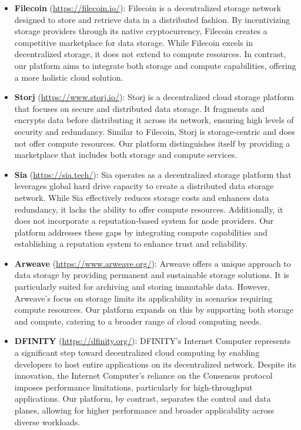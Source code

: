 \begin{itemize}
    \item {\bf Filecoin} (\url{https://filecoin.io/}): Filecoin is a decentralized storage network designed to store and retrieve data in a distributed fashion. By incentivizing storage providers through its native cryptocurrency, Filecoin creates a competitive marketplace for data storage. While Filecoin excels in decentralized storage, it does not extend to compute resources. In contrast, our platform aims to integrate both storage and compute capabilities, offering a more holistic cloud solution.

    \item {\bf Storj} (\url{https://www.storj.io/}): Storj is a decentralized cloud storage platform that focuses on secure and distributed data storage. It fragments and encrypts data before distributing it across its network, ensuring high levels of security and redundancy. Similar to Filecoin, Storj is storage-centric and does not offer compute resources. Our platform distinguishes itself by providing a marketplace that includes both storage and compute services.

    \item {\bf Sia} (\url{https://sia.tech/}): Sia operates as a decentralized storage platform that leverages global hard drive capacity to create a distributed data storage network. While Sia effectively reduces storage costs and enhances data redundancy, it lacks the ability to offer compute resources. Additionally, it does not incorporate a reputation-based system for node providers. Our platform addresses these gaps by integrating compute capabilities and establishing a reputation system to enhance trust and reliability.

    \item {\bf Arweave} (\url{https://www.arweave.org/}): Arweave offers a unique approach to data storage by providing permanent and sustainable storage solutions. It is particularly suited for archiving and storing immutable data. However, Arweave's focus on storage limits its applicability in scenarios requiring compute resources. Our platform expands on this by supporting both storage and compute, catering to a broader range of cloud computing needs.

    \item {\bf DFINITY} (\url{https://dfinity.org/}): DFINITY's Internet Computer represents a significant step toward decentralized cloud computing by enabling developers to host entire applications on its decentralized network. Despite its innovation, the Internet Computer's reliance on the Consensus protocol imposes performance limitations, particularly for high-throughput applications. Our platform, by contrast, separates the control and data planes, allowing for higher performance and broader applicability across diverse workloads.


\end{itemize}
